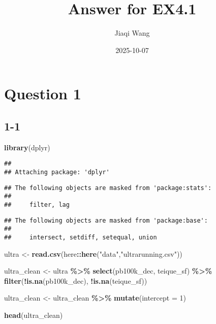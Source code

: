 \documentclass[
]{article}
\title{Answer for EX4.1}
\author{Jiaqi Wang}
\date{2025-10-07}
\newenvironment{Shaded}{\begin{snugshade}}{\end{snugshade}}
\newcommand{\AttributeTok}[1]{\textcolor[rgb]{0.13,0.29,0.53}{#1}}
\newcommand{\DecValTok}[1]{\textcolor[rgb]{0.00,0.00,0.81}{#1}}
\newcommand{\FunctionTok}[1]{\textcolor[rgb]{0.13,0.29,0.53}{\textbf{#1}}}
\newcommand{\NormalTok}[1]{#1}
\newcommand{\OtherTok}[1]{\textcolor[rgb]{0.56,0.35,0.01}{#1}}
\newcommand{\SpecialCharTok}[1]{\textcolor[rgb]{0.81,0.36,0.00}{\textbf{#1}}}
\newcommand{\StringTok}[1]{\textcolor[rgb]{0.31,0.60,0.02}{#1}}
\begin{document}
\maketitle

\section{Question 1}\label{question-1}

\subsection{1-1}\label{section}

\begin{Shaded}
\begin{Highlighting}[]
\FunctionTok{library}\NormalTok{(dplyr)}
\end{Highlighting}
\end{Shaded}

\begin{verbatim}
## 
## Attaching package: 'dplyr'
\end{verbatim}

\begin{verbatim}
## The following objects are masked from 'package:stats':
## 
##     filter, lag
\end{verbatim}

\begin{verbatim}
## The following objects are masked from 'package:base':
## 
##     intersect, setdiff, setequal, union
\end{verbatim}

\begin{Shaded}
\begin{Highlighting}[]
\NormalTok{ultra }\OtherTok{\textless{}{-}} \FunctionTok{read.csv}\NormalTok{(here}\SpecialCharTok{::}\FunctionTok{here}\NormalTok{(}\StringTok{"data"}\NormalTok{,}\StringTok{"ultrarunning.csv"}\NormalTok{))}

\NormalTok{ultra\_clean }\OtherTok{\textless{}{-}}\NormalTok{ ultra }\SpecialCharTok{\%\textgreater{}\%} 
  \FunctionTok{select}\NormalTok{(pb100k\_dec, teique\_sf) }\SpecialCharTok{\%\textgreater{}\%} 
  \FunctionTok{filter}\NormalTok{(}\SpecialCharTok{!}\FunctionTok{is.na}\NormalTok{(pb100k\_dec), }\SpecialCharTok{!}\FunctionTok{is.na}\NormalTok{(teique\_sf))}

\NormalTok{ultra\_clean }\OtherTok{\textless{}{-}}\NormalTok{ ultra\_clean }\SpecialCharTok{\%\textgreater{}\%} 
  \FunctionTok{mutate}\NormalTok{(}\AttributeTok{intercept =} \DecValTok{1}\NormalTok{)}

\FunctionTok{head}\NormalTok{(ultra\_clean)}
\end{Highlighting}
\end{Shaded}
\end{document}
